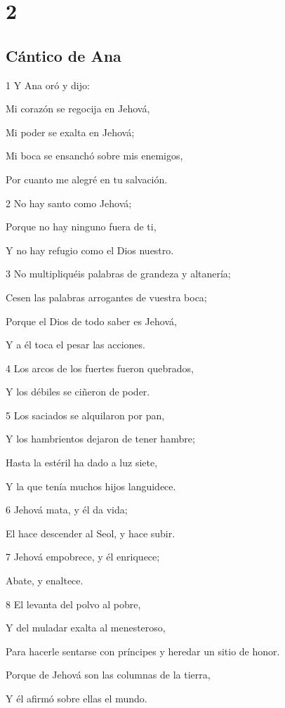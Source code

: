 \chapter{2}

\section*{Cántico de Ana}

\par 1 Y Ana oró y dijo:
\par Mi corazón se regocija en Jehová,
\par Mi poder se exalta en Jehová;
\par Mi boca se ensanchó sobre mis enemigos,
\par Por cuanto me alegré en tu salvación.
\par 2 No hay santo como Jehová;
\par Porque no hay ninguno fuera de ti,
\par Y no hay refugio como el Dios nuestro.
\par 3 No multipliquéis palabras de grandeza y altanería; 
\par Cesen las palabras arrogantes de vuestra boca;
\par Porque el Dios de todo saber es Jehová,
\par Y a él toca el pesar las acciones. 
\par 4 Los arcos de los fuertes fueron quebrados,
\par Y los débiles se ciñeron de poder.
\par 5 Los saciados se alquilaron por pan,
\par Y los hambrientos dejaron de tener hambre;
\par Hasta la estéril ha dado a luz siete,
\par Y la que tenía muchos hijos languidece.
\par 6 Jehová mata, y él da vida;
\par El hace descender al Seol, y hace subir. 
\par 7 Jehová empobrece, y él enriquece;
\par Abate, y enaltece.
\par 8 El levanta del polvo al pobre,
\par Y del muladar exalta al menesteroso,
\par Para hacerle sentarse con príncipes y heredar un sitio de honor.
\par Porque de Jehová son las columnas de la tierra,
\par Y él afirmó sobre ellas el mundo.
